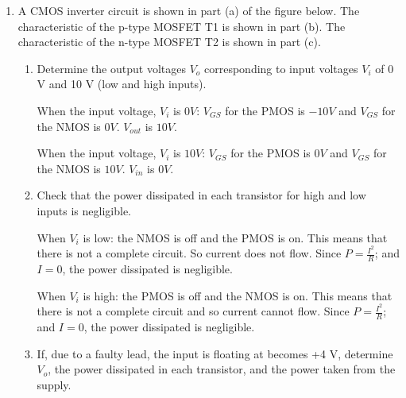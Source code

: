 \documentclass[10pt,\jkfside,a4paper]{article}
\begin{document}
\begin{enumerate}
\begin{examquestion}{2012}{2}{2}
\begin{enumerate}[label=(\alph*)]
\begin{enumerate}[label=(\roman*)]
\item{How could the rise-time of $V_{out}$ be reduced and what would be the 
impact of your proposed solution on the power dissipation of the circuit?}

The rise-time of $V_{out}$ could be reduced by decreasing the resistance of the 
resistor $R$. This would decrease the time constant $RC$ and so $V_{out}$ would 
rise quicker.\\
But it would increase the power dissipated in the circuit. Since $P=\frac{V^2}{R}$ 
and $V$ is constant: $P\propto\frac{1}{R}$. So a decrease in $R$ will increase the 
power dissipated in the circuit.

\end{enumerate}

\end{enumerate}

\end{examquestion}

\item{A CMOS inverter circuit is shown in part (a) of the figure below. The 
characteristic of the p-type MOSFET T1 is shown in part (b). The 
characteristic of the n-type MOSFET T2 is shown in part (c).}

\begin{enumerate}

\item{Determine the output voltages $V_o$ corresponding to input voltages 
$V_i$ of 0 V and 10 V (low and high inputs).}

When the input voltage, $V_i$ is $0V$: $V_{GS}$ for the PMOS is $-10V$ and $V_{GS}$ 
for the NMOS is $0V$. $V_{out}$ is $10V$.

When the input voltage, $V_i$ is $10V$: $V_{GS}$ for the PMOS is $0V$ and $V_{GS}$ 
for the NMOS is $10V$. $V_{in}$ is $0V$.

\item{Check that the power dissipated in each transistor for high and low 
inputs is negligible.}

When $V_i$ is low: the NMOS is off and the PMOS is on. This means that there 
is not a complete circuit. So current does not flow. Since $P=\frac{I^2}{R}$; and 
$I=0$, the power dissipated is negligible.

When $V_i$ is high: the PMOS is off and the NMOS is on. This means that there is not 
a complete circuit and so current cannot flow. Since $P=\frac{I^2}{R}$; and $I=0$, 
the power dissipated is negligible.

\item{If, due to a faulty lead, the input is floating at becomes +4 V, 
determine $V_o$, the power dissipated in each transistor, and the power 
taken from the supply.}




\end{enumerate}
\end{enumerate}
\end{document}
